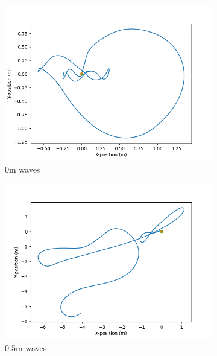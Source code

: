 \documentclass[class=article, crop=false]{standalone}
\begin{document}
\begin{figure}
    \centering
        \begin{subfigure}{0.8\textwidth}
        \centering
        \includegraphics{scenario1/rov-50m/0.0m/usv_position_controlled}
        \caption{0m waves}
    \end{subfigure}
    \vfill
    \begin{subfigure}{0.8\textwidth}
        \centering
        \includegraphics{scenario1/rov-50m/0.5m/usv_position_controlled}
        \caption{0.5m waves}
    \end{subfigure}
    \vfill
        \begin{subfigure}{0.8\textwidth}
        \centering

\end{subfigure}
\end{figure}
\end{document}
